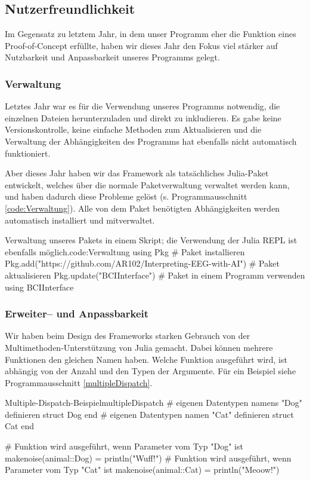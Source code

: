\documentclass[10pt]{article}
\newcommand{\coderef}[1]{Programmausschnitt \ref{#1}}
\begin{document}
\subsection{Nutzerfreundlichkeit}

Im Gegensatz zu letztem Jahr, in dem unser Programm eher die Funktion eines Proof-of-Concept erfüllte, haben wir dieses Jahr den Fokus viel stärker auf Nutzbarkeit und Anpassbarkeit unseres Programms gelegt.

\subsubsection{Verwaltung}

Letztes Jahr war es für die Verwendung unseres Programms notwendig, die einzelnen Dateien herunterzuladen und direkt zu inkludieren.
Es gabe keine Versionskontrolle, keine einfache Methoden zum Aktualisieren und die Verwaltung der Abhängigkeiten des Programms hat ebenfalls nicht automatisch funktioniert.

Aber dieses Jahr haben wir das Framework als tatsächliches Julia-Paket entwickelt, welches über die normale Paketverwaltung verwaltet werden kann, und haben dadurch diese Probleme gelöst (s. \coderef{code:Verwaltung}).
Alle von dem Paket benötigten Abhängigkeiten werden automatisch installiert und mitverwaltet.

\begin{code}[0.75]{Verwaltung unseres Pakets in einem Skript; die Verwendung der Julia REPL ist ebenfalls möglich.}{code:Verwaltung}
    using Pkg
    # Paket installieren
    Pkg.add("https://github.com/AR102/Interpreting-EEG-with-AI")
    # Paket aktualisieren
    Pkg.update("BCIInterface")
    # Paket in einem Programm verwenden
    using BCIInterface
\end{code}

\subsubsection{Erweiter-- und Anpassbarkeit}

Wir haben beim Design des Frameworks starken Gebrauch von der Multimethoden-Unterstützung von Julia gemacht.
Dabei können mehrere Funktionen den gleichen Namen haben. Welche Funktion ausgeführt wird, ist abhängig von der Anzahl und den Typen der Argumente. Für ein Beispiel siehe \coderef{multipleDispatch}.

\begin{code}{Multiple-Dispatch-Beispiel}{multipleDispatch}
# eigenen Datentypen namens "Dog" definieren
struct Dog end
# eigenen Datentypen namen "Cat" definieren
struct Cat end

# Funktion wird ausgeführt, wenn Parameter vom Typ "Dog" ist
makenoise(animal::Dog) = println("Wuff!")
# Funktion wird ausgeführt, wenn Parameter vom Typ "Cat" ist
makenoise(animal::Cat) = println("Meoow!")
\end{code}
\end{document}
